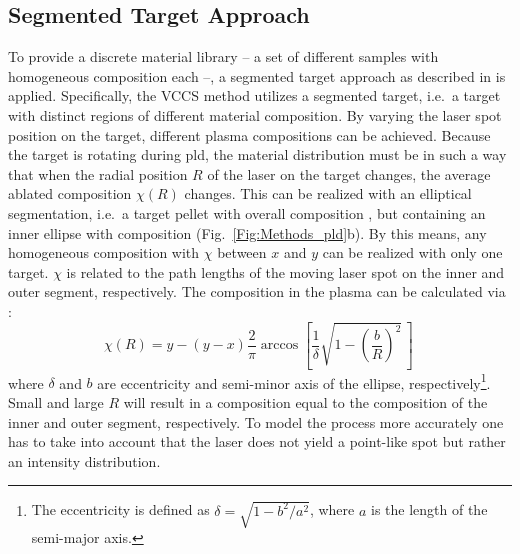 \subsection{Segmented Target Approach}\label{Sec:Methods_VCCS}
To provide a discrete material library -- a set of different samples with homogeneous composition each --, a segmented target approach as described in \textcite{vonwenckstern2020} is applied.
Specifically, the \gls{VCCS} method utilizes a segmented target, i.e.\ a target with distinct regions of different material composition.
By varying the laser spot position on the target, different plasma compositions can be achieved.
Because the target is rotating during \gls{pld}, the material distribution must be in such a way that when the radial position $R$ of the laser on the target changes, the average ablated composition $\chi(R)$ changes.
This can be realized with an elliptical segmentation, i.e.\ a target pellet with overall composition , but containing an inner ellipse with composition  (Fig.~\ref{Fig:Methods_pld}b).
By this means, any homogeneous composition  with $\chi$ between $x$ and $y$ can be realized with only one target.
$\chi$ is related to the path lengths of the moving laser spot on the inner and outer segment, respectively.
The composition in the plasma can be calculated via \cite{vonwenckstern2020}:
\begin{equation}\label{Equ:Methods_composition}
    \chi(R) = y-(y-x)\frac{2}{\pi}\arccos\left[\frac{1}{\delta}\sqrt{1-\left(\frac{b}{R}\right)^2}\,\right]\,
\end{equation}
where $\delta$ and $b$ are eccentricity and semi-minor axis of the ellipse, respectively\footnote{
    The eccentricity is defined as $\delta=\sqrt{1-b^2/a^2}$, where $a$ is the length of the semi-major axis.
}.
Small and large $R$ will result in a composition equal to the composition of the inner and outer segment, respectively.
To model the process more accurately one has to take into account that the laser does not yield a point-like spot but rather an intensity distribution.
